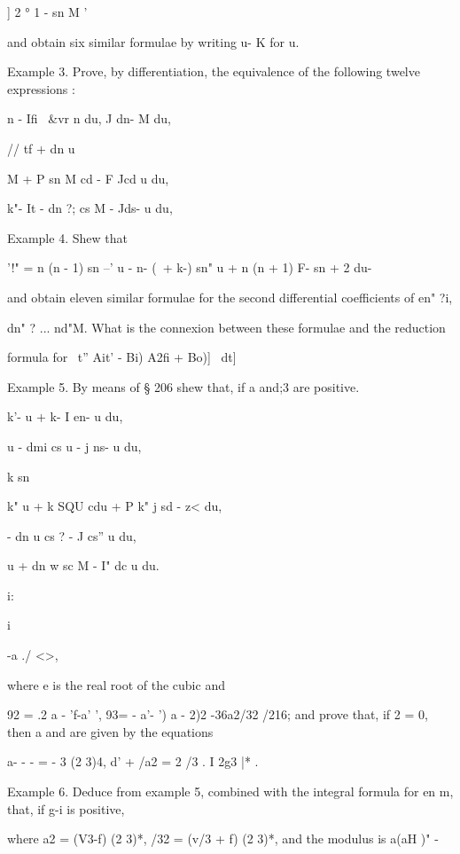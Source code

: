 ] 2 ° 1 - sn M '

and obtain six similar formulae by writing u- K for u.


Example 3. Prove, by differentiation, the equivalence of the following
twelve expressions :

n - Ifi \ \&vr n du, J dn- M du,

// tf + dn u%

M + P sn M cd - F Jcd u du,

k"- It - dn ?; cs M - Jds- u du,

Example 4. Shew that

'!" = n (n - 1) sn --' u - n- (\ + k-) sn" u + n (n + 1) F- sn + 2 du-

and obtain eleven similar formulae for the second differential
coefficients of en" ?i,

dn" ? ... nd"M. What is the connexion between these formulae and the
reduction

formula for \ t'' Ait' - Bi) A2fi + Bo)]~ dt]


Example 5. By means of § 206 shew that, if a and;3 are positive.

k'- u + k- I en- u du,

u - dmi cs u - j ns- u du,

k sn %

k" u + k SQU cdu + P k" j sd - z< du,

- dn u cs ? - J cs'' u du,

u + dn w sc M - I" dc u du.

i:

 i

-a ./ <>,

where e is the real root of the cubic and

92 = .2 a - 'f-a' ', 93= - a'- ') a - 2)2 -36a2/32 /216; and prove
that, if 2 = 0, then a and are given by the equations

a- - - = - 3 (2 3)4, d' + /a2 = 2 /3 . I 2g3 |* .

%
%

Example 6. Deduce from example 5, combined with the integral formula
for en m, that, if g-i is positive,

where a2 = (V3-f) (2 3)*, /32 = (v/3 + f) (2 3)*, and the modulus is
a(aH )" -

